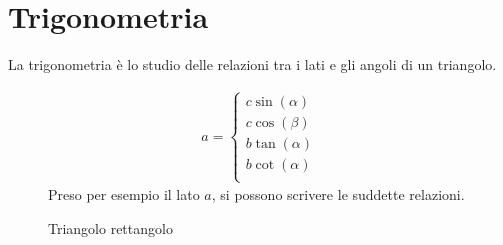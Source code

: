 
\section{Trigonometria}

La trigonometria è lo studio delle relazioni tra i lati e gli angoli di un triangolo.


\begin{figure}[H]
    \begin{minipage}[b]{0.45\textwidth}
        \centering
        \caption{Triangolo rettangolo}
        \label{fig:triangle}
    \end{minipage}
    \hfill
    \begin{minipage}[b]{0.45\textwidth}
        \vspace{0pt}
        \begin{align*}
            a = \begin{cases}
                    c \sin(\alpha) \\
                    c \cos(\beta)  \\
                    b \tan(\alpha) \\
                    b \cot(\alpha) \\
                \end{cases}
        \end{align*}
        Preso per esempio il lato $a$, si possono scrivere le suddette relazioni.
    \end{minipage}
\end{figure}

